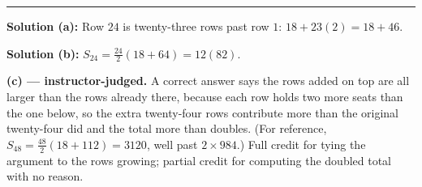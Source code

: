 \documentclass[12pt]{article}
\begin{document}
\vspace{0.2cm}\noindent\rule{\linewidth}{0.2pt}


\textbf{Solution (a):} Row $24$ is twenty-three rows past row $1$: $18 + 23(2) = 18 + 46$. 

\textbf{Solution (b):} $S_{24} = \frac{24}{2}(18 + 64) = 12(82)$. 

\textbf{(c) --- instructor-judged.} A correct answer says the rows added on top are all larger than the rows already there, because each row holds two more seats than the one below, so the extra twenty-four rows contribute more than the original twenty-four did and the total more than doubles. (For reference, $S_{48} = \frac{48}{2}(18 + 112) = 3120$, well past $2 \times 984$.) Full credit for tying the argument to the rows growing; partial credit for computing the doubled total with no reason.
\end{document}
